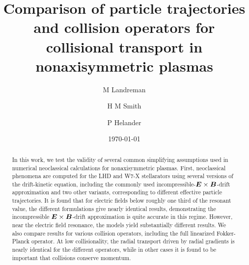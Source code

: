 \documentclass[12pt]{revtex4}
\newcommand{\vect}[1]{\mbox{\boldmath $#1$}}
\begin{document}
\title{Comparison of particle trajectories and collision operators for collisional transport in nonaxisymmetric plasmas}




\author{M Landreman}
\author{H M Smith}
\author{P Helander}


\date{\today}

\begin{abstract}

In this work, we test the validity of several common simplifying assumptions used in numerical neoclassical calculations
for nonaxisymmetric plasmas.
First, neoclassical phenomena are computed for the LHD and W7-X stellarators using several versions of the drift-kinetic
equation, 
including the commonly used incompressible-$\vect{E}\times\vect{B}$-drift approximation
and two other variants,
corresponding to different effective particle trajectories.
It is found that
for electric fields below roughly one third of the resonant value, the different formulations give
nearly identical results, demonstrating the incompressible $\vect{E}\times\vect{B}$-drift approximation
is quite accurate in this regime. 
However, near the electric field resonance,
the models yield substantially different results.
We also compare results for various collision operators, including the full linearized Fokker-Planck operator.
At low collisionality, the radial transport driven by radial
gradients is nearly identical for the different operators,
while in other cases it is found to be important that collisions conserve momentum.

\end{abstract}
\end{document}
